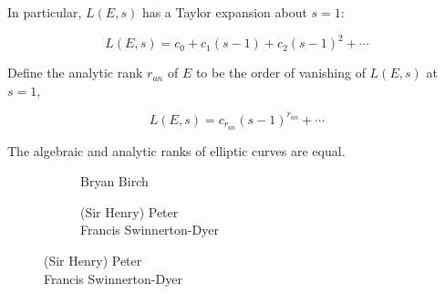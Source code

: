 \begin{frame}[plain]
In particular, $L(E,s)$ has a Taylor expansion about $s=1$: \vspace{0.3cm}

	\[
	L(E,s)= c_0 + c_1 (s-1) + c_2(s-1)^2 + \cdots
	\] \pause \vspace{0.3cm}
	
Define the analytic rank $r_{an}$ of $E$ to be the order of vanishing of $L(E,s)$ at $s=1$, \vspace{0.3cm}

	\[
	L(E,s)= c_{r_{an}} (s - 1)^{r_{an}} + \cdots
	\] 
\end{frame}



\begin{frame}[plain]

\begin{conj}[BSD]
The algebraic and analytic ranks of elliptic curves are equal.
\end{conj} 
	\begin{figure}[h]
	\centering
	\begin{subfigure}{0.3\textwidth}
	\captionsetup{labelformat=empty}
	\centering
	\caption{Bryan Birch \\ \phantom{x}}
	\end{subfigure}
	\begin{subfigure}{0.6\textwidth}
	\captionsetup{labelformat=empty}
	\centering
	\caption{(Sir Henry) Peter \\ Francis Swinnerton-Dyer}
	\end{subfigure}
	\end{figure} \vspace{0.3cm}


\end{frame}
